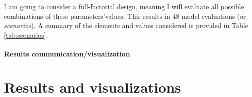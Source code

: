 I am going to consider a full-factorial design, meaning I will evaluate all possible combinations of these parameters'values. This results in 48 model evaluations (or \textit{scenarios}). A summary of the elements and values considered is provided in Table \ref{tab:scenarios}.


\begin{table}
    \centering
    \caption{Inputs and values considered for the sensitivity analysis.}
    \label{tab:scenarios}
\end{table}




\paragraph{Results communication/visualization}




\section{Results and visualizations} \label{sec:ch4_res}